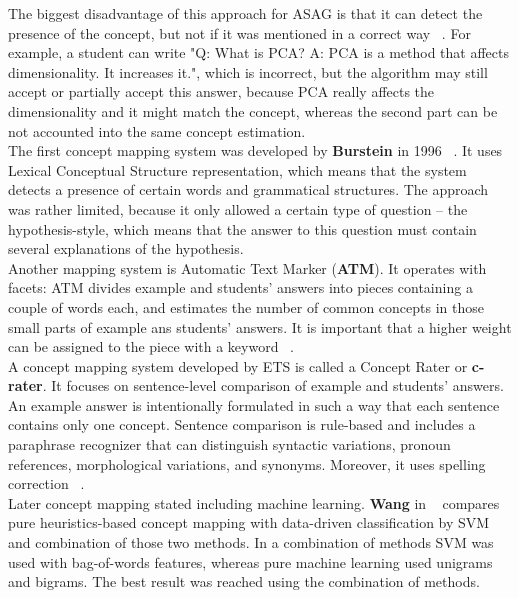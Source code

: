 The biggest disadvantage of this approach for ASAG is that it can detect the presence of the concept, but not if it was mentioned in a correct way ~\cite{SemEval}. For example, a student can write "Q: What is PCA? A: PCA is a method that affects dimensionality. It increases it.", which is incorrect, but the algorithm may still accept or partially accept this answer, because PCA really affects the dimensionality and it might match the concept, whereas the second part can be not accounted into the same concept estimation.\\

The first concept mapping system was developed by \textbf{Burstein} in 1996 ~\cite{Burrows}. It uses  Lexical Conceptual Structure representation, which means that the system detects a presence of certain words and grammatical structures. The approach was rather limited, because it only allowed a certain type of question -- the  hypothesis-style, which means that the answer to this question must contain several explanations of the hypothesis.\\

Another mapping system is Automatic Text Marker (\textbf{ATM}). It operates with facets: ATM divides example and students' answers into pieces containing a couple of words each, and estimates the number of common concepts in those small parts of example ans students' answers. It is important that a higher weight can be assigned to the piece with a keyword ~\cite{Burrows}.\\

A concept mapping system developed by ETS is called a Concept Rater or \textbf{c-rater}. It focuses on sentence-level comparison of example and students' answers. An example answer is intentionally formulated in such a way that each sentence contains only one concept. Sentence comparison is rule-based and includes a paraphrase recognizer that can distinguish syntactic variations, pronoun references, morphological variations, and synonyms. Moreover, it uses spelling correction ~\cite{c-rater}. \\

Later concept mapping stated including machine learning. \textbf{Wang} in ~\cite{Wang} compares pure heuristics-based concept mapping with  data-driven classification by SVM and combination of those two methods. In a combination of methods SVM was used with bag-of-words features, whereas pure machine learning used unigrams and bigrams. The best result was reached using the combination of methods.\\

